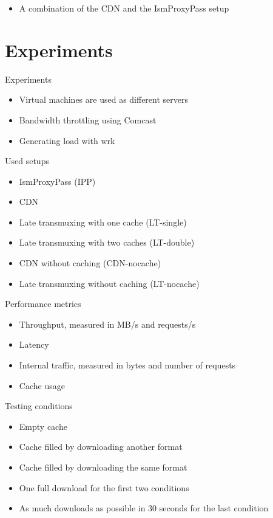 \documentclass[xcolor=svgnames]{beamer}
\begin{document}
\begin{frame}
    \begin{itemize}
        \item A combination of the CDN and the IsmProxyPass setup
    \end{itemize}
\end{frame}

\section{Experiments}
\begin{frame}{Experiments}
    \begin{itemize}
        \item Virtual machines are used as different servers
        \item Bandwidth throttling using Comcast
        \item Generating load with wrk
    \end{itemize}
\end{frame}

\begin{frame}{Used setups}
    \begin{itemize}
        \item IsmProxyPass (IPP)
        \item CDN
        \item Late transmuxing with one cache (LT-single)
        \item Late transmuxing with two caches (LT-double)
        \item CDN without caching (CDN-nocache)
        \item Late transmuxing without caching (LT-nocache)
    \end{itemize}
\end{frame}

\begin{frame}{Performance metrics}
    \begin{itemize}
        \item Throughput, measured in MB/s and requests/s
        \item Latency
        \item Internal traffic, measured in bytes and number of requests
        \item Cache usage
    \end{itemize}
\end{frame}


\begin{frame}{Testing conditions}
    \begin{itemize}
        \item Empty cache
        \item Cache filled by downloading another format
        \item Cache filled by downloading the same format
        \item One full download for the first two conditions
        \item As much downloads as possible in 30 seconds for the last condition
    \end{itemize}
\end{frame}
\end{document}

